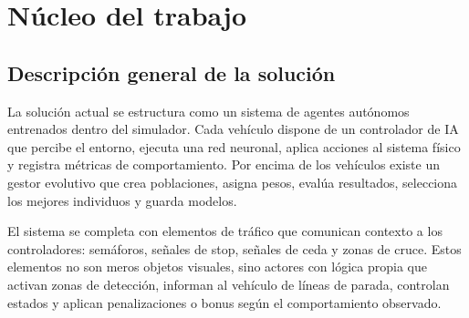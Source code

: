 \chapter{Núcleo del trabajo}

\section{Descripción general de la solución}

La solución actual se estructura como un sistema de agentes autónomos entrenados dentro del simulador. Cada vehículo dispone de un controlador de IA que percibe el entorno, ejecuta una red neuronal, aplica acciones al sistema físico y registra métricas de comportamiento. Por encima de los vehículos existe un gestor evolutivo que crea poblaciones, asigna pesos, evalúa resultados, selecciona los mejores individuos y guarda modelos.

El sistema se completa con elementos de tráfico que comunican contexto a los controladores: semáforos, señales de stop, señales de ceda y zonas de cruce. Estos elementos no son meros objetos visuales, sino actores con lógica propia que activan zonas de detección, informan al vehículo de líneas de parada, controlan estados y aplican penalizaciones o bonus según el comportamiento observado.


